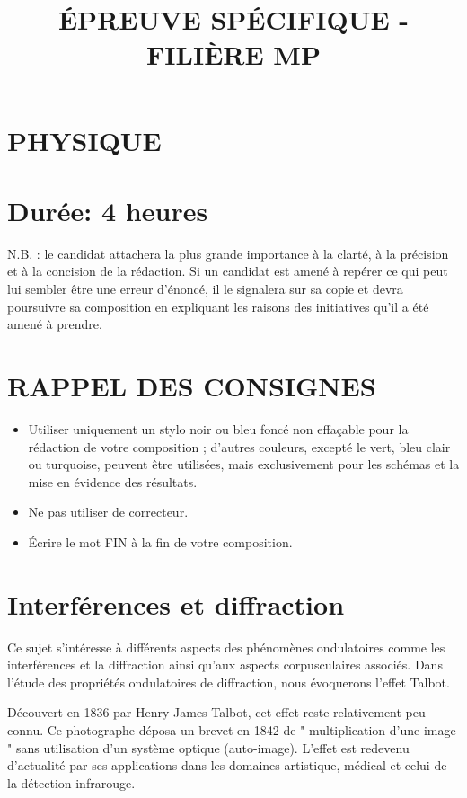 \documentclass[10pt]{article}
\title{ÉPREUVE SPÉCIFIQUE - FILIÈRE MP }
\author{}
\date{}
\begin{document}
\maketitle
\section*{PHYSIQUE}
\section*{Durée: \(\mathbf{4}\) heures}
N.B. : le candidat attachera la plus grande importance à la clarté, à la précision et à la concision de la rédaction. Si un candidat est amené à repérer ce qui peut lui sembler être une erreur d'énoncé, il le signalera sur sa copie et devra poursuivre sa composition en expliquant les raisons des initiatives qu'il a été amené à prendre.

\section*{RAPPEL DES CONSIGNES}
\begin{itemize}
  \item Utiliser uniquement un stylo noir ou bleu foncé non effaçable pour la rédaction de votre composition ; d'autres couleurs, excepté le vert, bleu clair ou turquoise, peuvent être utilisées, mais exclusivement pour les schémas et la mise en évidence des résultats.
  \item Ne pas utiliser de correcteur.
  \item Écrire le mot FIN à la fin de votre composition.
\end{itemize}

\section*{Interférences et diffraction}
Ce sujet s'intéresse à différents aspects des phénomènes ondulatoires comme les interférences et la diffraction ainsi qu'aux aspects corpusculaires associés. Dans l'étude des propriétés ondulatoires de diffraction, nous évoquerons l'effet Talbot.

Découvert en 1836 par Henry James Talbot, cet effet reste relativement peu connu. Ce photographe déposa un brevet en 1842 de " multiplication d'une image " sans utilisation d'un système optique (auto-image). L'effet est redevenu d'actualité par ses applications dans les domaines artistique, médical et celui de la détection infrarouge.
\end{document}
